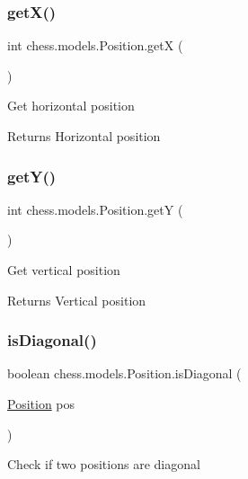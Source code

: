 \subsubsection{\texorpdfstring{get\+X()}{getX()}}
{\footnotesize\ttfamily int chess.\+models.\+Position.\+getX (\begin{DoxyParamCaption}{ }\end{DoxyParamCaption})}

Get horizontal position

\begin{DoxyReturn}{Returns}
Horizontal position 
\end{DoxyReturn}
\mbox{\label{classchess_1_1models_1_1_position_aa4cdabf057a4a9fac849b04dc687a8ed}} 
\subsubsection{\texorpdfstring{get\+Y()}{getY()}}
{\footnotesize\ttfamily int chess.\+models.\+Position.\+getY (\begin{DoxyParamCaption}{ }\end{DoxyParamCaption})}

Get vertical position

\begin{DoxyReturn}{Returns}
Vertical position 
\end{DoxyReturn}
\mbox{\label{classchess_1_1models_1_1_position_a359f1be865e9ba19dc94116ce1fe8214}} 
\subsubsection{\texorpdfstring{is\+Diagonal()}{isDiagonal()}}
{\footnotesize\ttfamily boolean chess.\+models.\+Position.\+is\+Diagonal (\begin{DoxyParamCaption}\item[{\mbox{\hyperlink{classchess_1_1models_1_1_position}{Position}}}]{pos }\end{DoxyParamCaption})}

Check if two positions are diagonal


